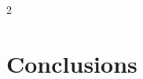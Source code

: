 \documentclass[11pt,a4paper]{{ "{" }}{{cookiecutter.document_class}}{{ "}" }}
\numberwithin{equation}{section}
\begin{document}
\begin{multicols}{2}
\section{Conclusions}



\end{multicols}
\end{document}
